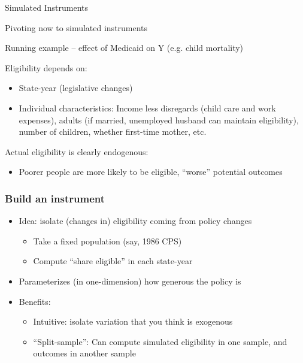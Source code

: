 \documentclass[notes,11pt, aspectratio=169]{beamer}
\newenvironment{wideitemize}{\itemize\addtolength{\itemsep}{10pt}}{\enditemize}
\begin{document}
\begin{frame}{Simulated Instruments}
  \begin{wideitemize}
  \item Pivoting now to simulated instruments
  \item Running example -- effect of Medicaid on Y (e.g. child mortality)
  \item Eligibility depends on:
    \begin{itemize}
    \item State-year (legislative changes)
    \item Individual characteristics: Income less disregards (child care and work expenses), adults (if married, unemployed husband can maintain eligibility), number of children, whether first-time mother, etc.  
    \end{itemize} 
    Actual eligibility is clearly endogenous:
    \begin{itemize}
    \item Poorer people are more likely to be eligible, ``worse'' potential outcomes
    \end{itemize}
  \end{wideitemize}
\end{frame}



\begin{frame}
\frametitle{Build an instrument}

\begin{itemize}
\item  Idea: isolate (changes in) eligibility coming from policy changes
  \begin{itemize}
  \item Take a fixed population (say, 1986 CPS)
  \item Compute ``share eligible'' in each state-year 
  \end{itemize} 
\item		Parameterizes (in one-dimension) how generous the policy is
\item Benefits:
  \begin{itemize}
  \item   Intuitive: isolate variation that you think is exogenous  
  \item ``Split-sample'': Can compute simulated eligibility in one sample, and outcomes in another sample
  \end{itemize}
\end{itemize}
\end{frame}
\end{document}
